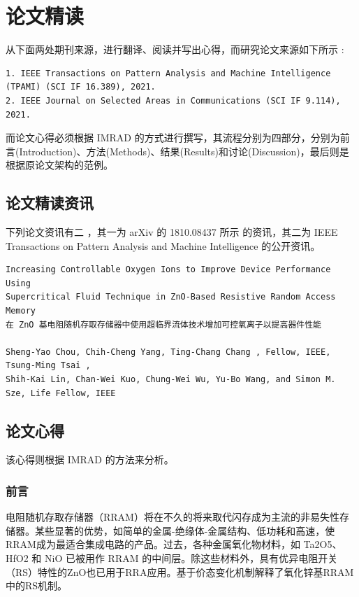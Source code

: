 \chapter{论文精读}
\label{chap:1}

从下面两处期刊来源，进行翻译、阅读并写出心得，而研究论文来源如下所示 :
\begin{Verbatim}
1. IEEE Transactions on Pattern Analysis and Machine Intelligence
(TPAMI) (SCI IF 16.389), 2021.
2. IEEE Journal on Selected Areas in Communications (SCI IF 9.114), 2021.
\end{Verbatim}

而论文心得必须根据 IMRAD 的方式进行撰写，其流程分别为四部分，分别为前言(Introduction)、方法(Methods)、结果(Results)和讨论(Discussion)，最后则是根据原论文架构的范例。

\section{论文精读资讯}

下列论文资讯有二 \cite{garcia2020admd} ，其一为 arXiv 的 1810.08437 所示 的资讯，其二为 IEEE Transactions on Pattern Analysis and Machine Intelligence 的公开资讯。

\begin{Verbatim}
Increasing Controllable Oxygen Ions to Improve Device Performance Using 
Supercritical Fluid Technique in ZnO-Based Resistive Random Access Memory
在 ZnO 基电阻随机存取存储器中使用超临界流体技术增加可控氧离子以提高器件性能

Sheng-Yao Chou, Chih-Cheng Yang, Ting-Chang Chang , Fellow, IEEE, Tsung-Ming Tsai , 
Shih-Kai Lin, Chan-Wei Kuo, Chung-Wei Wu, Yu-Bo Wang, and Simon M. Sze, Life Fellow, IEEE
\end{Verbatim}


\section{论文心得}

该心得则根据 IMRAD 的方法来分析。

\subsection{前言}

电阻随机存取存储器（RRAM）将在不久的将来取代闪存成为主流的非易失性存储器。某些显著的优势，如简单的金属-绝缘体-金属结构、低功耗和高速，使RRAM成为最适合集成电路的产品。过去，各种金属氧化物材料，如 Ta2O5、HfO2 和 NiO 已被用作 RRAM 的中间层。除这些材料外，具有优异电阻开关（RS）特性的ZnO也已用于RRA应用。基于价态变化机制解释了氧化锌基RRAM中的RS机制。

